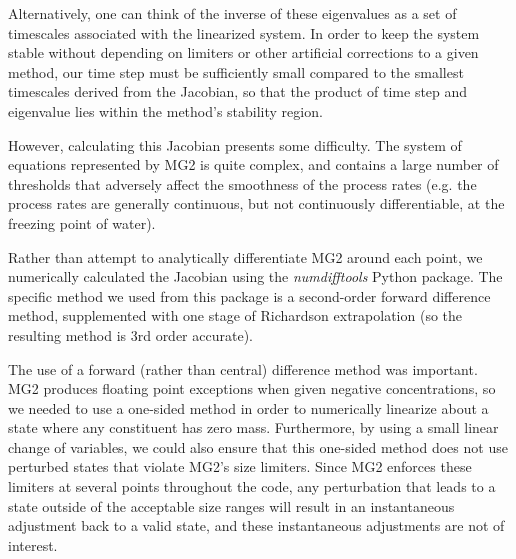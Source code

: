 \documentclass [11pt, proquest] {uwthesis}[2020/02/24]
\begin{document}
Alternatively, one can think of the inverse of these eigenvalues as a set of timescales associated with the linearized system. In order to keep the system stable without depending on limiters or other artificial corrections to a given method, our time step must be sufficiently small compared to the smallest timescales derived from the Jacobian, so that the product of time step and eigenvalue lies within the method's stability region.

However, calculating this Jacobian presents some difficulty. The system of equations represented by MG2 is quite complex, and contains a large number of thresholds that adversely affect the smoothness of the process rates (e.g. the process rates are generally continuous, but not continuously differentiable, at the freezing point of water).

Rather than attempt to analytically differentiate MG2 around each point, we numerically calculated the Jacobian using the \emph{numdifftools} Python package. The specific method we used from this package is a second-order forward difference method, supplemented with one stage of Richardson extrapolation (so the resulting method is 3rd order accurate).

The use of a forward (rather than central) difference method was important. MG2 produces floating point exceptions when given negative concentrations, so we needed to use a one-sided method in order to numerically linearize about a state where any constituent has zero mass. Furthermore, by using a small linear change of variables, we could also ensure that this one-sided method does not use perturbed states that violate MG2's size limiters. Since MG2 enforces these limiters at several points throughout the code, any perturbation that leads to a state outside of the acceptable size ranges will result in an instantaneous adjustment back to a valid state, and these instantaneous adjustments are not of interest.
\end{document}
